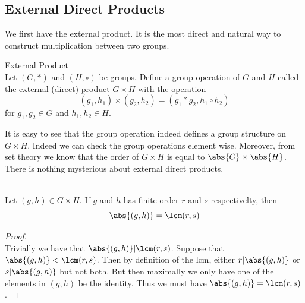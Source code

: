 \documentclass[a4paper]{article}
\begin{document}
\subsection{External Direct Products}
We first have the external product. It is the most direct and natural way to construct multiplication between two groups. 

\begin{defn}{External Product}{}\\
Let $(G,\ast)$ and $(H,\circ)$ be groups. Define a group operation of $G$ and $H$ called the external (direct) product $G\times H$ with the operation $$(g_1,h_1)\times(g_2,h_2)=(g_1\ast g_2,h_1\circ h_2)$$ for $g_1,g_2\in G$ and $h_1,h_2\in H$. 
\end{defn}

It is easy to see that the group operation indeed defines a group structure on $G\times H$. Indeed we can check the group operations element wise. Moreover, from set theory we know that the order of $G\times H$ is equal to $\abs{G}\times\abs{H}$. There is nothing mysterious about external direct products. 

\begin{prp}{}{}\\
Let $(g,h)\in G\times H$. If $g$ and $h$ has finite order $r$ and $s$ respectivelty, then $$\abs{(g,h)}=\lcm(r,s)$$ 
\begin{proof}\\
Trivially we have that $\abs{(g,h)}|\lcm(r,s)$. Suppose that $\abs{(g,h)}<\lcm(r,s)$. Then by definition of the lcm, either $r|\abs{(g,h)}$ or $s|\abs{(g,h)}$ but not both. But then maximally we only have one of the elements in $(g,h)$ be the identity. Thus we must have $\abs{(g,h)}=\lcm(r,s)$. 
\end{proof}
\end{prp}
\end{document}
